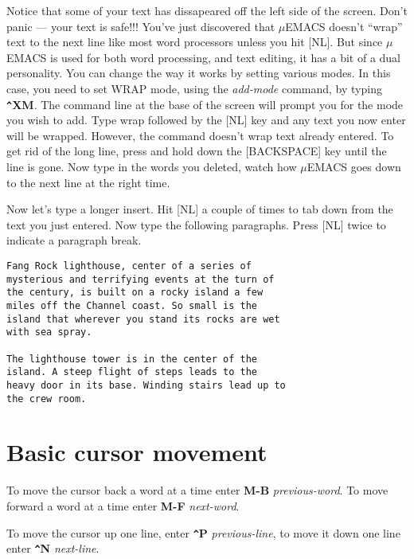 Notice that some of your text has dissapeared off the left side of the
screen. Don't panic --- your text is safe!!! You've just discovered
that $\mu$EMACS doesn't ``wrap'' text to the next line like most word
processors unless you hit [NL]. But since $\mu$EMACS is used for both
word processing, and text editing, it has a bit of a dual personality.
You can change the way it works by setting various modes. In this case,
you need to set WRAP mode, using the {\it add-mode} command, by typing
{\bf \verb+^+XM}. The command line at the base of the screen will prompt
you for the mode you wish to add. Type wrap followed by the [NL] key
and any text you now enter will be wrapped. However, the command
doesn't wrap text already entered. To get rid of the long line, press
and hold down the [BACKSPACE] key until the line is gone. Now type in
the words you deleted, watch how $\mu$EMACS goes down to the next line
at the right time.

Now let's type a longer insert. Hit [NL] a couple of times to tab down
from the text you just entered. Now type the following paragraphs.
Press [NL] twice to indicate a paragraph break.

\begin{verbatim}
Fang Rock lighthouse, center of a series of
mysterious and terrifying events at the turn of
the century, is built on a rocky island a few
miles off the Channel coast. So small is the
island that wherever you stand its rocks are wet
with sea spray.

The lighthouse tower is in the center of the
island. A steep flight of steps leads to the
heavy door in its base. Winding stairs lead up to
the crew room.
\end{verbatim}

\section{Basic cursor movement}

To move the cursor back a word at a time enter {\bf M-B} {\it
previous-word}. To move forward a word at a time enter {\bf M-F} {\it
next-word}.

To move the cursor up one line, enter {\bf\verb+^+P} {\it
previous-line}, to move it down one line enter {\bf \verb+^+N} {\it
next-line}.


